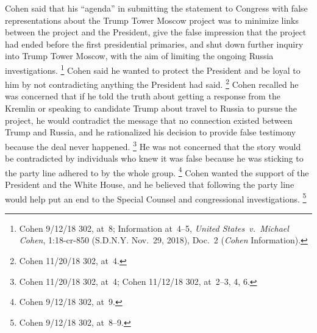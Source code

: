 Cohen said that his ``agenda'' in submitting the statement to Congress with false representations about the Trump Tower Moscow project was to minimize links between the project and the President, give the false impression that the project had ended before the first presidential primaries, and shut down further inquiry into Trump Tower Moscow, with the aim of limiting the ongoing Russia investigations.%
\footnote{Cohen 9/12/18 302, at~8;
Information at~4--5, \textit{United States~v.\ Michael Cohen}, 1:18-cr-850 (S.D.N.Y. Nov.~29, 2018), Doc.~2 (\textit{Cohen} Information).}
Cohen said he wanted to protect the President and be loyal to him by not contradicting anything the President had said.%
\footnote{Cohen 11/20/18 302, at~4.}
Cohen recalled he was concerned that if he told the truth about getting a response from the Kremlin or speaking to candidate Trump about travel to Russia to pursue the project, he would contradict the message that no connection existed between Trump and Russia, and he rationalized his decision to provide false testimony because the deal never happened.%
\footnote{Cohen 11/20/18 302, at~4;
Cohen 11/12/18 302, at~2--3, 4, 6.}
He was not concerned that the story would be contradicted by individuals who knew it was false because he was sticking to the party line adhered to by the whole group.%
\footnote{Cohen 9/12/18 302, at~9.}
Cohen wanted the support of the President and the White House, and he believed that following the party line would help put an end to the Special Counsel and congressional investigations.%
\footnote{Cohen 9/12/18 302, at~8--9.}

